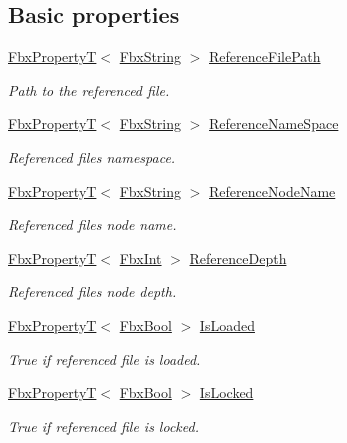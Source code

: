 \subsection*{Basic properties}
\begin{DoxyCompactItemize}
\item 
\hyperlink{class_fbx_property_t}{Fbx\+PropertyT}$<$ \hyperlink{class_fbx_string}{Fbx\+String} $>$ \hyperlink{class_fbx_scene_reference_a782b9db13deb9ab4b1f5b1b48c4dbb0a}{Reference\+File\+Path}
\begin{DoxyCompactList}\small\item\em Path to the referenced file. \end{DoxyCompactList}\item 
\hyperlink{class_fbx_property_t}{Fbx\+PropertyT}$<$ \hyperlink{class_fbx_string}{Fbx\+String} $>$ \hyperlink{class_fbx_scene_reference_aa29e70b4a27c20a537c4daa567624821}{Reference\+Name\+Space}
\begin{DoxyCompactList}\small\item\em Referenced file\textquotesingle{}s namespace. \end{DoxyCompactList}\item 
\hyperlink{class_fbx_property_t}{Fbx\+PropertyT}$<$ \hyperlink{class_fbx_string}{Fbx\+String} $>$ \hyperlink{class_fbx_scene_reference_a322d144d3a3e9d641132c7f65c924c2b}{Reference\+Node\+Name}
\begin{DoxyCompactList}\small\item\em Referenced file\textquotesingle{}s node name. \end{DoxyCompactList}\item 
\hyperlink{class_fbx_property_t}{Fbx\+PropertyT}$<$ \hyperlink{fbxtypes_8h_a088fa96de3b0b3ea69f0f6afef525dfb}{Fbx\+Int} $>$ \hyperlink{class_fbx_scene_reference_a66ad8666d23493dc9e20cb7fa411963b}{Reference\+Depth}
\begin{DoxyCompactList}\small\item\em Referenced file\textquotesingle{}s node depth. \end{DoxyCompactList}\item 
\hyperlink{class_fbx_property_t}{Fbx\+PropertyT}$<$ \hyperlink{fbxtypes_8h_a92e0562b2fe33e76a242f498b362262e}{Fbx\+Bool} $>$ \hyperlink{class_fbx_scene_reference_a971731e9c034714443001ee94de52562}{Is\+Loaded}
\begin{DoxyCompactList}\small\item\em {\ttfamily True} if referenced file is loaded. \end{DoxyCompactList}\item 
\hyperlink{class_fbx_property_t}{Fbx\+PropertyT}$<$ \hyperlink{fbxtypes_8h_a92e0562b2fe33e76a242f498b362262e}{Fbx\+Bool} $>$ \hyperlink{class_fbx_scene_reference_a5b7de2086b4f2999c7473329e8887168}{Is\+Locked}
\begin{DoxyCompactList}\small\item\em {\ttfamily True} if referenced file is locked. \end{DoxyCompactList}\end{DoxyCompactItemize}
